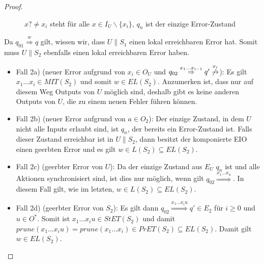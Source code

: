 \begin{proof}
\begin{itemize}
\begin{figure} [h!tbp]
\begin{center}
        \caption{$x?\neq x_i$ steht für alle $x\in I_U\backslash\{x_i\}$, $q_n$
          ist der einzige Error-Zustand}
        \label{UmitE}
      \end{center}
      \end{figure}
      Da $q_{01} \overset{w}{\Rightarrow} q$ gilt, wissen wir, dass $U\|S_1$
      einen lokal erreichbaren Error hat. Somit muss $U\|S_2$ ebenfalls einen
      lokal erreichbaren Error haben.
      \begin{itemize}
        \item Fall 2a) (neuer Error aufgrund von $x_i\in O_U$ und $q_{02}
          \overset{x_1\dots x_{i-1}}{\Rightarrow} q'
          \overset{x_i}{\not{\hspace{-0.1cm}\rightarrow}}$): Es gilt $x_1\dots
          x_i\in MIT(S_2)$ und somit $w\in EL(S_2)$. Anzumerken ist, dass nur
          auf diesem Weg Outputs von $U$ möglich sind, deshalb gibt es keine
          anderen Outputs von $U$, die zu einem neuen Fehler führen können.
        \item Fall 2b) (neuer Error aufgrund von $a\in O_2$): Der einzige
          Zustand, in dem $U$ nicht alle Inputs erlaubt sind, ist $q_n$, der
          bereits ein Error-Zustand ist. Falls dieser Zustand erreichbar ist in
          $U\|S_2$, dann besitzt der komponierte EIO einen geerbten Error und
          es gilt $w\in L(S_2)\subseteq EL(S_2)$.
        \item Fall 2c) (geerbter Error von $U$): Da der einzige Zustand aus
          $E_U$ $q_n$ ist und alle Aktionen synchronisiert sind, ist dies nur
          möglich, wenn gilt $q_{02} \overset{x_1\dots x_n}{\Rightarrow}$. In
          diesem Fall gilt, wie im letzten, $w\in L(S_2)\subseteq EL(S_2)$.
        \item Fall 2d) (geerbter Error von $S_2$): Es gilt dann $q_{02}
          \overset{x_1\dots x_iu}{\Rightarrow} q'\in E_2$ für $i\geq 0$ und
          $u\in O^*$. Somit ist $x_1\dots x_iu\in StET(S_2)$ und damit
          $prune(x_1\dots x_iu)=prune(x_1\dots x_i)\in PrET(S_2)\subseteq
          EL(S_2)$. Damit gilt $w\in EL(S_2)$.
      \end{itemize}
  \end{itemize}
\end{proof}


